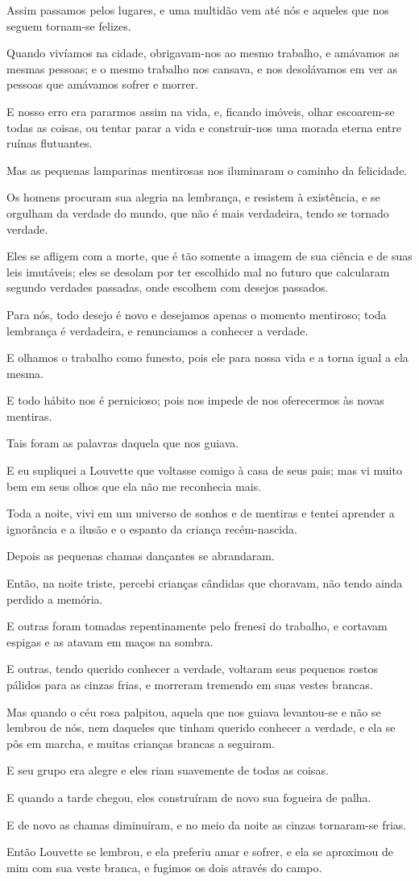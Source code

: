 Assim passamos pelos lugares, e uma multidão vem até nós e aqueles que
nos seguem tornam-se felizes.

Quando vivíamos na cidade, obrigavam-nos ao mesmo trabalho, e amávamos
as mesmas pessoas; e o mesmo trabalho nos cansava, e nos desolávamos em
ver as pessoas que amávamos sofrer e morrer.

E nosso erro era pararmos assim na vida, e, ficando imóveis, olhar
escoarem-se todas as coisas, ou tentar parar a vida e construir-nos uma
morada eterna entre ruínas flutuantes.

Mas as pequenas lamparinas mentirosas nos iluminaram o caminho da
felicidade.

Os homens procuram sua alegria na lembrança, e resistem à existência, e
se orgulham da verdade do mundo, que não é mais verdadeira, tendo se
tornado verdade.

Eles se afligem com a morte, que é tão somente a imagem de sua ciência
e de suas leis imutáveis; eles se desolam por ter escolhido mal no futuro
que calcularam segundo verdades passadas, onde escolhem com desejos
passados.

Para nós, todo desejo é novo e desejamos apenas o momento mentiroso;
toda lembrança é verdadeira, e renunciamos a conhecer a verdade.

E olhamos o trabalho como funesto, pois ele para nossa vida e a torna
igual a ela mesma.

E todo hábito nos é pernicioso; pois nos impede de nos oferecermos às
novas mentiras.

Tais foram as palavras daquela que nos guiava.

E eu supliquei a Louvette que voltasse comigo à casa de seus pais; mas
vi muito bem em seus olhos que ela não me reconhecia mais.

Toda a noite, vivi em um universo de sonhos e de mentiras e tentei
aprender a ignorância e a ilusão e o espanto da criança recém-nascida.

Depois as pequenas chamas dançantes se abrandaram.

Então, na noite triste, percebi crianças cândidas que choravam, não
tendo ainda perdido a memória.

E outras foram tomadas repentinamente pelo frenesi do trabalho, e
cortavam espigas e as atavam em maços na sombra.

E outras, tendo querido conhecer a verdade, voltaram seus pequenos
rostos pálidos para as cinzas frias, e morreram tremendo em suas vestes
brancas.

Mas quando o céu rosa palpitou, aquela que nos guiava levantou-se e não
se lembrou de nós, nem daqueles que tinham querido conhecer a verdade, e
ela se pôs em marcha, e muitas crianças brancas a seguiram.

E seu grupo era alegre e eles riam suavemente de todas as coisas.

E quando a tarde chegou, eles construíram de novo sua fogueira de
palha.

E de novo as chamas diminuíram, e no meio da noite as cinzas
tornaram-se frias.

Então Louvette se lembrou, e ela preferiu amar e sofrer, e ela se aproximou 
de mim com sua veste branca, e fugimos os dois através do campo.

